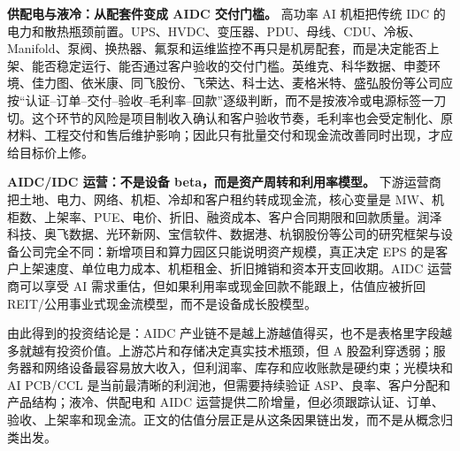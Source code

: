 \textbf{供配电与液冷：从配套件变成 AIDC 交付门槛。} 高功率 AI 机柜把传统 IDC 的电力和散热瓶颈前置。UPS、HVDC、变压器、PDU、母线、CDU、冷板、Manifold、泵阀、换热器、氟泵和运维监控不再只是机房配套，而是决定能否上架、能否稳定运行、能否通过客户验收的交付门槛。英维克、科华数据、申菱环境、佳力图、依米康、同飞股份、飞荣达、科士达、麦格米特、盛弘股份等公司应按“认证--订单--交付--验收--毛利率--回款”逐级判断，而不是按液冷或电源标签一刀切。这个环节的风险是项目制收入确认和客户验收节奏，毛利率也会受定制化、原材料、工程交付和售后维护影响；因此只有批量交付和现金流改善同时出现，才应给目标价上修。

\textbf{AIDC/IDC 运营：不是设备 beta，而是资产周转和利用率模型。} 下游运营商把土地、电力、网络、机柜、冷却和客户租约转成现金流，核心变量是 MW、机柜数、上架率、PUE、电价、折旧、融资成本、客户合同期限和回款质量。润泽科技、奥飞数据、光环新网、宝信软件、数据港、杭钢股份等公司的研究框架与设备公司完全不同：新增项目和算力园区只能说明资产规模，真正决定 EPS 的是客户上架速度、单位电力成本、机柜租金、折旧摊销和资本开支回收期。AIDC 运营商可以享受 AI 需求重估，但如果利用率或现金回款不能跟上，估值应被折回 REIT/公用事业式现金流模型，而不是设备成长股模型。

由此得到的投资结论是：AIDC 产业链不是越上游越值得买，也不是表格里字段越多就越有投资价值。上游芯片和存储决定真实技术瓶颈，但 A 股盈利穿透弱；服务器和网络设备最容易放大收入，但利润率、库存和应收账款是硬约束；光模块和 AI PCB/CCL 是当前最清晰的利润池，但需要持续验证 ASP、良率、客户分配和产品结构；液冷、供配电和 AIDC 运营提供二阶增量，但必须跟踪认证、订单、验收、上架率和现金流。正文的估值分层正是从这条因果链出发，而不是从概念归类出发。

